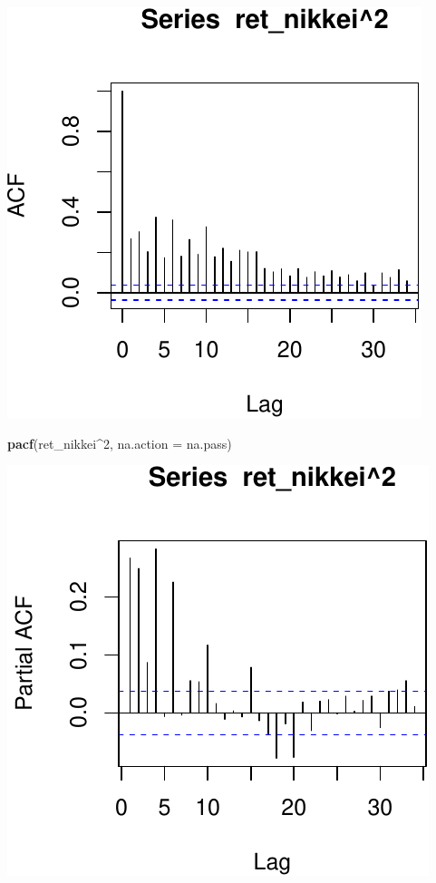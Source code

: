 \documentclass[11pt,]{article}
\newenvironment{Shaded}{\begin{snugshade}}{\end{snugshade}}
\newcommand{\KeywordTok}[1]{\textcolor[rgb]{0.13,0.29,0.53}{\textbf{#1}}}
\newcommand{\DataTypeTok}[1]{\textcolor[rgb]{0.13,0.29,0.53}{#1}}
\newcommand{\DecValTok}[1]{\textcolor[rgb]{0.00,0.00,0.81}{#1}}
\newcommand{\OperatorTok}[1]{\textcolor[rgb]{0.81,0.36,0.00}{\textbf{#1}}}
\newcommand{\NormalTok}[1]{#1}
\begin{document}
\begin{center}\includegraphics{FMC_T4_PhD_ARMA_GARCH_files/figure-latex/ret_ind_ACF_sq-3} \end{center}

\begin{Shaded}
\begin{Highlighting}[]
\KeywordTok{pacf}\NormalTok{(ret_nikkei}\OperatorTok{^}\DecValTok{2}\NormalTok{, }\DataTypeTok{na.action =}\NormalTok{ na.pass)}
\end{Highlighting}
\end{Shaded}

\begin{center}\includegraphics{FMC_T4_PhD_ARMA_GARCH_files/figure-latex/ret_ind_ACF_sq-4} \end{center}
\end{document}
